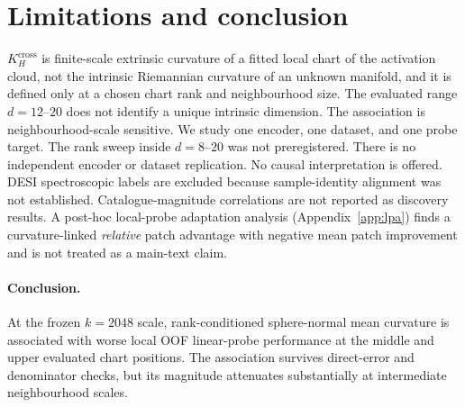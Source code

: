 \documentclass[mlabstract]{jmlr}
\begin{document}
\section{Limitations and conclusion}
\label{sec:limit}

$K_{H}^{\mathrm{cross}}$ is finite-scale extrinsic curvature of a fitted local chart of the activation cloud, not the intrinsic Riemannian curvature of an unknown manifold, and it is defined only at a chosen chart rank and neighbourhood size. The evaluated range $d{=}12$--$20$ does not identify a unique intrinsic dimension. The association is neighbourhood-scale sensitive. We study one encoder, one dataset, and one probe target. The rank sweep inside $d{=}8$--$20$ was not preregistered. There is no independent encoder or dataset replication. No causal interpretation is offered. DESI spectroscopic labels are excluded because sample-identity alignment was not established. Catalogue-magnitude correlations are not reported as discovery results. A post-hoc local-probe adaptation analysis (Appendix~\ref{app:lpa}) finds a curvature-linked \emph{relative} patch advantage with negative mean patch improvement and is not treated as a main-text claim.

\paragraph{Conclusion.}
At the frozen $k{=}2048$ scale, rank-conditioned sphere-normal mean curvature is associated with worse local OOF linear-probe performance at the middle and upper evaluated chart positions. The association survives direct-error and denominator checks, but its magnitude attenuates substantially at intermediate neighbourhood scales.

\clearpage


\clearpage
\appendix

\end{document}

